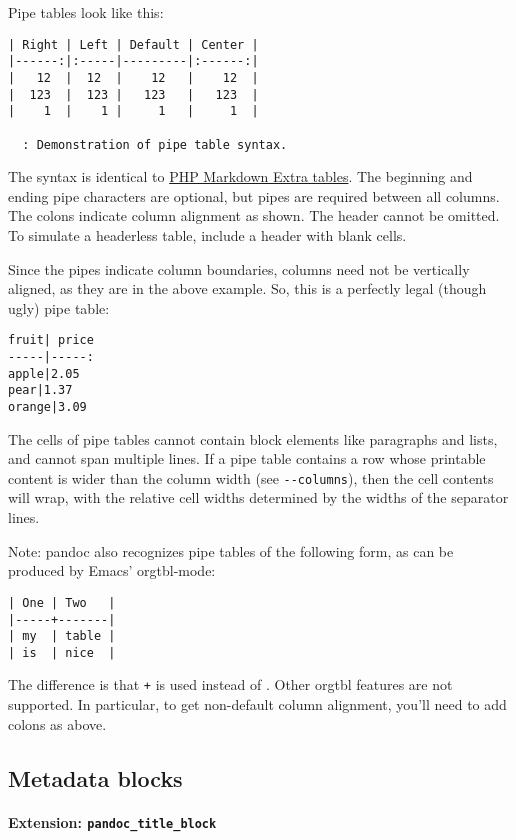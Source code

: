 \documentclass[]{article}
\let\oldparagraph\paragraph
\renewcommand{\paragraph}[1]{\oldparagraph{#1}\mbox{}}
\begin{document}
Pipe tables look like this:

\begin{verbatim}
| Right | Left | Default | Center |
|------:|:-----|---------|:------:|
|   12  |  12  |    12   |    12  |
|  123  |  123 |   123   |   123  |
|    1  |    1 |     1   |     1  |

  : Demonstration of pipe table syntax.
\end{verbatim}

The syntax is identical to
\href{https://michelf.ca/projects/php-markdown/extra/\#table}{PHP
Markdown Extra tables}. The beginning and ending pipe characters are
optional, but pipes are required between all columns. The colons
indicate column alignment as shown. The header cannot be omitted. To
simulate a headerless table, include a header with blank cells.

Since the pipes indicate column boundaries, columns need not be
vertically aligned, as they are in the above example. So, this is a
perfectly legal (though ugly) pipe table:

\begin{verbatim}
fruit| price
-----|-----:
apple|2.05
pear|1.37
orange|3.09
\end{verbatim}

The cells of pipe tables cannot contain block elements like paragraphs
and lists, and cannot span multiple lines. If a pipe table contains a
row whose printable content is wider than the column width (see
\texttt{-\/-columns}), then the cell contents will wrap, with the
relative cell widths determined by the widths of the separator lines.

Note: pandoc also recognizes pipe tables of the following form, as can
be produced by Emacs' orgtbl-mode:

\begin{verbatim}
| One | Two   |
|-----+-------|
| my  | table |
| is  | nice  |
\end{verbatim}

The difference is that \texttt{+} is used instead of
\texttt{\textbar{}}. Other orgtbl features are not supported. In
particular, to get non-default column alignment, you'll need to add
colons as above.

\hypertarget{metadata-blocks}{\subsection{Metadata
blocks}\label{metadata-blocks}}

\hypertarget{extension-pandoc_title_block}{\paragraph{\texorpdfstring{Extension:
\texttt{pandoc\_title\_block}}{Extension: pandoc\_title\_block}}\label{extension-pandoc_title_block}}
\end{document}
